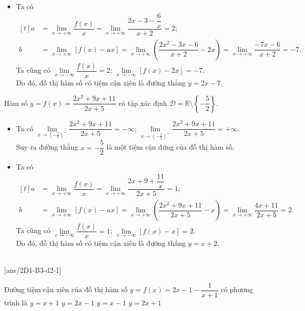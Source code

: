 \begin{vd}
{\begin{listEX}
\begin{itemize}
				\item Ta có $\begin{aligned}[t]
					a&=\lim\limits_{x \rightarrow+\infty} \dfrac{f(x)}{x}=\lim\limits_{x \rightarrow+\infty} \dfrac{2x-3-\dfrac{6}{x}}{x+2}=2;\\
					b&=\lim\limits_{x \rightarrow+\infty}[f(x)-ax]=\lim\limits_{x \rightarrow+\infty}\left(\dfrac{2x^{2}-3x-6}{x+2}-2x\right)=\lim\limits_{x \rightarrow+\infty} \dfrac{-7x-6}{x+2}=-7.
				\end{aligned}$\\
				Ta cũng có $\lim\limits_{x \rightarrow-\infty} \dfrac{f(x)}{x}=2$; $\lim\limits_{x \rightarrow-\infty}[f(x)-2x]=-7$.\\
				Do đó, đồ thị hàm số có tiệm cận xiên là đường thẳng $y=2x-7$.
			\end{itemize}
			\item Hàm số $y=f(x)=\dfrac{2x^{2}+9x+11}{2x+5}$ có tập xác định $\mathscr{D}=\mathbb{R} \setminus \left\lbrace -\dfrac{5}{2}\right\rbrace$.
			\begin{itemize}
				\item 
				Ta có $\lim\limits_{x \rightarrow \left(-\tfrac{5}{2}\right)^{-}} \dfrac{2x^{2}+9x+11}{2x+5}=-\infty$; $\lim\limits_{x \rightarrow \left(-\tfrac{5}{2}\right)^{+}} \dfrac{2x^{2}+9x+11}{2x+5}=+\infty$.\\
				Suy ra đường thẳng $x=-\dfrac{5}{2}$ là một tiệm cận đứng của đồ thị hàm số.
				\item Ta có $\begin{aligned}[t]
					a&=\lim\limits_{x \rightarrow+\infty} \dfrac{f(x)}{x}=\lim\limits_{x \rightarrow+\infty} \dfrac{2x+9+\dfrac{11}{x}}{2x+5}=1;\\
					b&=\lim\limits_{x \rightarrow+\infty}[f(x)-ax]=\lim\limits_{x \rightarrow+\infty}\left(\dfrac{2x^{2}+9x+11}{2x+5}-x\right)=\lim\limits_{x \rightarrow+\infty} \dfrac{4x+11}{2x+5}=2.
				\end{aligned}$\\
				Ta cũng có $\lim\limits_{x \rightarrow-\infty} \dfrac{f(x)}{x}=1$; $\lim\limits_{x \rightarrow-\infty}[f(x)-x]=2$.\\
				Do đó, đồ thị hàm số có tiệm cận xiên là đường thẳng $y=x+2$.
			\end{itemize}
		\end{listEX}	
	}
\end{vd}

\baitaptn
{} \\
\setcounter{ex}{0}
[ans/2D1-B3-d2-1]
\begin{ex}
	Đường tiệm cận xiên của đồ thị hàm số $y=f(x)=2x-1-\dfrac{1}{x+1}$ có phương trình là
	\choice
	{$y=x+1$}
	{\True $y=2x-1$}
	{$y=x-1$}
	{$y=2x+1$}
\end{ex}

